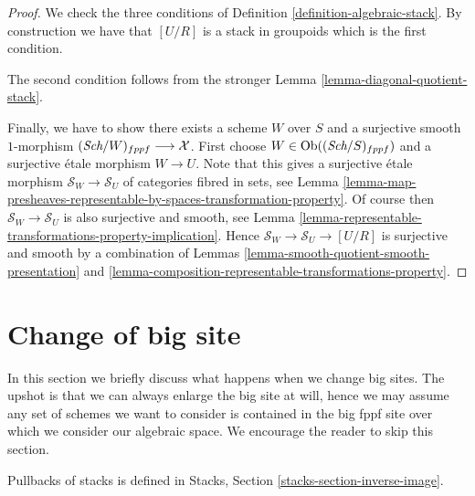 \begin{proof}
We check the three conditions of
Definition \ref{definition-algebraic-stack}.
By construction we have that $[U/R]$ is a stack in groupoids
which is the first condition.

\medskip\noindent
The second condition follows from the stronger
Lemma \ref{lemma-diagonal-quotient-stack}.

\medskip\noindent
Finally, we have to show there exists a scheme $W$ over $S$
and a surjective smooth $1$-morphism
$(\textit{Sch}/W)_{fppf} \longrightarrow \mathcal{X}$.
First choose $W \in \text{Ob}((\textit{Sch}/S)_{fppf})$ and a
surjective \'etale morphism $W \to U$. Note that this
gives a surjective \'etale morphism $\mathcal{S}_W \to \mathcal{S}_U$
of categories fibred in sets, see
Lemma
\ref{lemma-map-presheaves-representable-by-spaces-transformation-property}.
Of course then $\mathcal{S}_W \to \mathcal{S}_U$ is also surjective and
smooth, see
Lemma \ref{lemma-representable-transformations-property-implication}.
Hence $\mathcal{S}_W \to \mathcal{S}_U \to [U/R]$ is surjective
and smooth by a combination of
Lemmas \ref{lemma-smooth-quotient-smooth-presentation} and
\ref{lemma-composition-representable-transformations-property}.
\end{proof}





\section{Change of big site}
\label{section-change-big-site}

\noindent
In this section we briefly discuss what happens when we change big sites.
The upshot is that we can always enlarge the big site at will, hence we
may assume any set of schemes we want to consider is contained in the big
fppf site over which we consider our algebraic space.
We encourage the reader to skip this section.

\medskip\noindent
Pullbacks of stacks is defined in
Stacks, Section \ref{stacks-section-inverse-image}.

